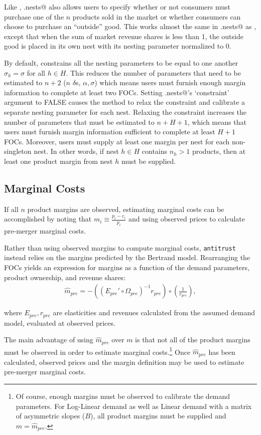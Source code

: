 \documentclass[11pt,numbers=noenddot,pointlessnumbers]{scrreprt}
\newcommand{\atr}{{\tt antitrust}}
\numberwithin{equation}{section}
\begin{document}
Like \verb@ces@,  \verb@ces.nests@ also allows
users to specify whether or not consumers must purchase one of the $n$
products sold in the market or whether consumers can choose to
purchase an ``outside'' good. This works almost the same in
\verb@ces.nests@ as \verb@ces@, except that when the sum of market
revenue shares is less than 1,
the outside good is placed in its own nest with its nesting
parameter normalized to 0.

By default, \verb@calcSlopes@ constrains all the nesting parameters to be equal
to one another $\sigma_h=\sigma$ for all $h\in H$. This reduces the
number of parameters that need to be estimated to $n+2$ ($n$
$\delta$s, $\alpha,\sigma$) which means users must furnish enough
margin information to complete at least two FOCs. Setting
\verb@ces.nests@'s `constraint' argument to
FALSE causes the \verb@calcSlopes@ method to relax the constraint and calibrate a separate
nesting parameter for each nest. Relaxing the constraint increases the
number of parameters that must be estimated to $n+H+1$, which means
that users must furnish margin information sufficient to
complete at least $H+1$ FOCs.  Moreover, users must supply at least
one margin per nest for each non-singleton nest. In other words, if
nest $h\in H$ contains $n_h>1$ products,
then at least one product margin from nest $h$ must be supplied.


\subsection{Marginal Costs}
If all $n$ product margins are observed, estimating marginal costs can be accomplished by
noting that $m_i\equiv\frac{p_i-c_i}{p_i}$ and using observed prices to
calculate pre-merger marginal costs.

Rather than using observed margins to compute marginal
costs, \atr{} instead relies on the margins predicted by the Bertrand
model. Rearranging the FOCs yields an expression for margins as a
function of the demand parameters, product ownership, and revenue
shares:
\begin{align*}
  \hat{m}_{pre}=-((E_{pre}'\circ\Omega_{pre})^{-1}r_{pre})\circ(\frac{1}{r_{pre}}),
\end{align*}

where $E_{pre},r_{pre}$ are elasticities and revenues calculated from
the assumed demand model, evaluated at observed prices.

The main advantage of using $\hat{m}_{pre}$ over $m$ is that not all of the
product margins must be observed in order to estimate marginal
costs.\footnote{Of course, enough margins must be observed to
  calibrate the demand parameters. For Log-Linear demand as well as Linear
  demand with a matrix of asymmetric slopes ($B$), all product margins
must be supplied and $m=\hat{m}_{pre}$.} Once $\hat{m}_{pre}$
has been calculated, observed prices and the margin definition may be
used to estimate pre-merger marginal costs.
\end{document}
